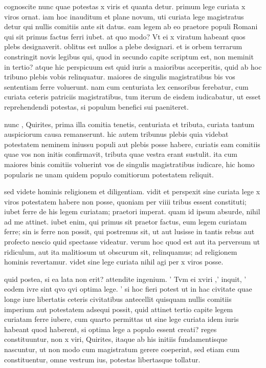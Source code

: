  cognoscite nunc quae potestas x viris et quanta detur. primum lege curiata x viros ornat. iam hoc inauditum et plane novum, uti curiata lege magistratus detur qui nullis comitiis ante sit datus. eam legem ab eo praetore populi Romani qui sit primus factus ferri iubet. at quo modo? Vt ei x viratum habeant quos plebs designaverit. oblitus est nullos a plebe designari. et is orbem terrarum constringit novis legibus qui, quod in secundo capite scriptum est, non meminit in tertio? atque hic perspicuum est quid iuris a maioribus acceperitis, quid ab hoc tribuno plebis vobis relinquatur. maiores de singulis magistratibus bis vos sententiam ferre voluerunt. nam cum centuriata lex censoribus ferebatur, cum curiata ceteris patriciis magistratibus, tum iterum de eisdem iudicabatur, ut esset reprehendendi potestas, si populum benefici sui paeniteret.

 nunc , Quirites, prima illa comitia tenetis, centuriata et tributa, curiata tantum auspiciorum causa remanserunt. hic autem tribunus plebis quia videbat potestatem neminem iniussu populi aut plebis posse habere, curiatis eam comitiis quae vos non initis confirmavit, tributa quae vestra erant sustulit. ita cum maiores binis comitiis voluerint vos de singulis magistratibus iudicare, hic homo popularis ne unam quidem populo comitiorum potestatem reliquit.

 sed videte hominis religionem et diligentiam. vidit et perspexit sine curiata lege x viros potestatem habere non posse, quoniam per viiii tribus essent constituti; iubet ferre de his legem curiatam; praetori imperat. quam id ipsum absurde, nihil ad me attinet. iubet enim, qui primus sit praetor factus, eum legem curiatam ferre; sin is ferre non possit, qui postremus sit, ut aut lusisse in tantis rebus aut profecto nescio quid spectasse videatur. verum hoc quod est aut ita perversum ut ridiculum, aut ita malitiosum ut obscurum sit, relinquamus; ad religionem hominis revertamur. videt sine lege curiata nihil agi per x viros posse.

 quid postea, si ea lata non erit? attendite ingenium. ' Tvm ei xviri ,' inquit, ' eodem ivre sint qvo qvi optima lege. ' si hoc fieri potest ut in hac civitate quae longe iure libertatis ceteris civitatibus antecellit quisquam nullis comitiis imperium aut potestatem adsequi possit, quid attinet tertio capite legem curiatam ferre iubere, cum quarto permittas ut sine lege curiata idem iuris habeant quod haberent, si optima lege a populo essent creati? reges constituuntur, non x viri, Quirites, itaque ab his initiis fundamentisque nascuntur, ut non modo cum magistratum gerere coeperint, sed etiam cum constituentur, omne vestrum ius, potestas libertasque tollatur.

